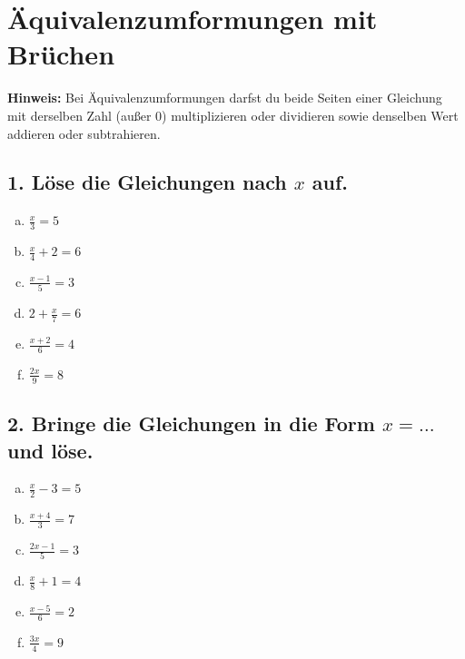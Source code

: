 
\section*{Äquivalenzumformungen mit Brüchen}

\textbf{Hinweis:} Bei Äquivalenzumformungen darfst du beide Seiten einer Gleichung mit derselben Zahl (außer 0) multiplizieren oder dividieren sowie denselben Wert addieren oder subtrahieren.

\vspace{1em}

\subsection*{1. Löse die Gleichungen nach $x$ auf.}

\begin{enumerate}[a)]
    \item $\displaystyle \frac{x}{3} = 5$
    \item $\displaystyle \frac{x}{4} + 2 = 6$
    \item $\displaystyle \frac{x-1}{5} = 3$
    \item $\displaystyle 2 + \frac{x}{7} = 6$
    \item $\displaystyle \frac{x+2}{6} = 4$
    \item $\displaystyle \frac{2x}{9} = 8$
\end{enumerate}

\vspace{1em}

\subsection*{2. Bringe die Gleichungen in die Form $x = \ldots$ und löse.}

\begin{enumerate}[a)]
    \item $\displaystyle \frac{x}{2} - 3 = 5$
    \item $\displaystyle \frac{x+4}{3} = 7$
    \item $\displaystyle \frac{2x-1}{5} = 3$
    \item $\displaystyle \frac{x}{8} + 1 = 4$
    \item $\displaystyle \frac{x-5}{6} = 2$
    \item $\displaystyle \frac{3x}{4} = 9$
\end{enumerate}

